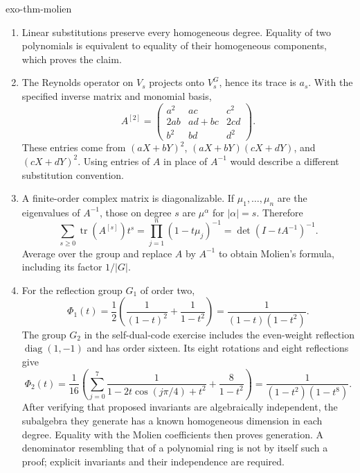 \begin{correction}{exo-thm-molien}
\begin{enumerate}
\item Linear substitutions preserve every homogeneous degree. Equality
of two polynomials is equivalent to equality of their homogeneous
components, which proves the claim.
\item The Reynolds operator on $V_s$ projects onto $V_s^G$, hence its
trace is $a_s$. With the specified inverse matrix and monomial basis,
\[
 A^{[2]}=\begin{pmatrix}
 a^2&ac&c^2\\2ab&ad+bc&2cd\\b^2&bd&d^2
 \end{pmatrix}.
\]
These entries come from $(aX+bY)^2$, $(aX+bY)(cX+dY)$, and
$(cX+dY)^2$. Using entries of $A$ in place of $A^{-1}$ would describe
a different substitution convention.
\item A finite-order complex matrix is diagonalizable. If
$\mu_1,\ldots,\mu_n$ are the eigenvalues of $A^{-1}$, those on degree
$s$ are $\mu^\alpha$ for $|\alpha|=s$. Therefore
\[
 \sum_{s\geq0}\operatorname{tr}(A^{[s]})t^s
   =\prod_{j=1}^n(1-t\mu_j)^{-1}=\det(I-tA^{-1})^{-1}.
\]
Average over the group and replace $A$ by $A^{-1}$ to obtain Molien's
formula, including its factor $1/|G|$.
\item For the reflection group $G_1$ of order two,
\[
 \Phi_1(t)=\frac12\left(\frac1{(1-t)^2}+\frac1{1-t^2}\right)
          =\frac1{(1-t)(1-t^2)}.
\]
The group $G_2$ in the self-dual-code exercise includes the even-weight
reflection $\operatorname{diag}(1,-1)$ and has order sixteen. Its eight
rotations and eight reflections give
\[
 \Phi_2(t)=\frac1{16}\left(
    \sum_{j=0}^7\frac1{1-2t\cos(j\pi/4)+t^2}
       +\frac8{1-t^2}\right)
       =\frac1{(1-t^2)(1-t^8)}.
\]
After verifying that proposed invariants are algebraically independent,
the subalgebra they generate has a known homogeneous dimension in each
degree. Equality with the Molien coefficients then proves generation.
A denominator resembling that of a polynomial ring is not by itself
such a proof; explicit invariants and their independence are required.
\end{enumerate}
\end{correction}

